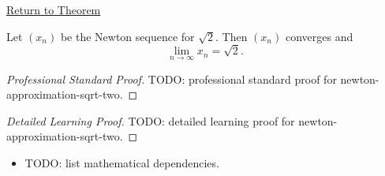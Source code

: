 \newpage
{}
\label{prf:newton-approximation-sqrt-two}

\begin{remark*}[Return]
\hyperref[thm:newton-approximation-sqrt-two]{Return to Theorem}
\end{remark*}

\begin{theorem*}
Let $(x_n)$ be the Newton sequence for $\sqrt{2}$. Then $(x_n)$ converges
and
\[
  \lim_{n\to\infty}x_n=\sqrt{2}.
\]

\smallskip
\noindent
\end{theorem*}

\begin{proof}[Professional Standard Proof]
\LRAProofBodyStart
TODO: professional standard proof for newton-approximation-sqrt-two.
\end{proof}

\begin{proof}[Detailed Learning Proof]
\LRAProofBodyStart
TODO: detailed learning proof for newton-approximation-sqrt-two.
\end{proof}

\begin{remark*}
\end{remark*}

\begin{dependencies}
\begin{itemize}
  \item TODO: list mathematical dependencies.
\end{itemize}
\end{dependencies}

\clearpage
